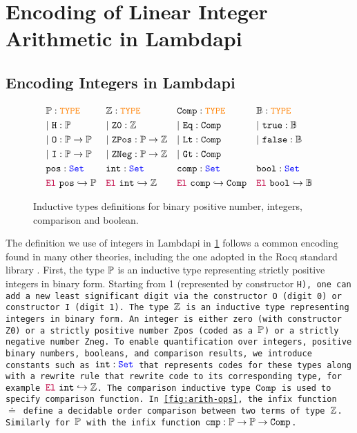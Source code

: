 \section{Encoding of Linear Integer Arithmetic in Lambdapi}
\label{sec:encoding}

\subsection{Encoding Integers in Lambdapi}


\begin{figure}
\centering
\begin{align*}\label{eq:eq1}
&\bb{P}: \type & &\bb{Z}: \type   & &\tt{Comp}: \type & &\bb{B}: \type \\
&|~\tt{H} : \bb{P} & &|~\tt{Z0}: \bb{Z} & &|~\tt{Eq}: \tt{Comp} & &|~\tt{true}: \bb{B} \\
&|~\tt{O}: \bb{P} \ra \bb{P} & &|~\tt{ZPos}: \bb{P} \ra \bb{Z} & &|~\tt{Lt}: \tt{Comp} & &|~\tt{false}: \bb{B} \\
&|~\tt{I}: \bb{P} \ra \bb{P} & &|~\tt{ZNeg}: \bb{P} \ra \bb{Z} & &|~\tt{Gt}: \tt{Comp} & &\\
&\tt{pos}: \set & &\tt{int}: \set & &\tt{comp}: \set & &\tt{bool}: \set \\
&\el~\tt{pos} \re \bb{P} & &\el~\tt{int} \re \bb{Z} & &\el~\tt{comp} \re \tt{Comp} & &\el~\tt{bool} \re \bb{B}
\end{align*}
\caption{Inductive types definitions for binary positive number, integers, comparison and boolean.}
\label{fig:sorts-constructors}
\end{figure}

The definition we use of integers in Lambdapi in \cref{fig:sorts-constructors} follows a common encoding found in many other theories, including the one adopted in the Rocq standard library \cite{Rocq-refman}.
First, the type $\bb{P}$  is an inductive type representing strictly positive integers in binary form.
Starting from 1 (represented by constructor \tt{H}), one can add a new least significant digit via the constructor \tt{O} (digit 0) or constructor \tt{I} (digit 1). 
The type $\bb{Z}$ is an inductive type representing integers in binary form.
An integer is either zero (with constructor \tt{Z0}) or a strictly positive number \tt{Zpos} (coded as a $\bb{P}$) or a strictly negative number \tt{Zneg}. %
%
To enable quantification over integers, positive binary numbers, booleans, and comparison results, we introduce constants such as $\tt{int}: \set$ that represents codes for these types along with a rewrite rule that rewrite code to its corresponding type, for example $\el~\tt{int} \re \bb{Z}$.
The comparison inductive type $\tt{Comp}$ is used to specify comparison function. In \cref{fig:arith-ops}, the infix function $\doteq$ define a decidable order comparison between two terms of type $\bb{Z}$. Similarly for $\bb{P}$ with the infix function $\tt{cmp}: \bb{P} \ra \bb{P} \ra \tt{Comp}$.

